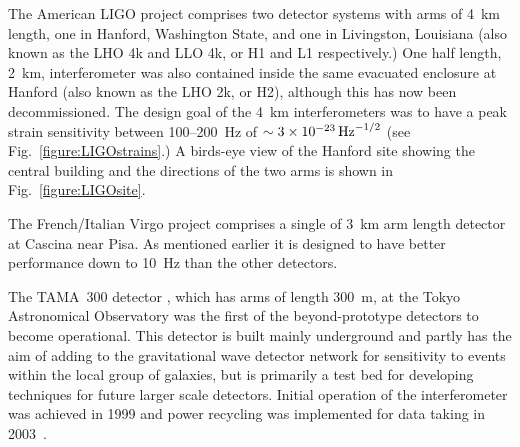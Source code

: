 \documentclass{article}
\begin{document}
The American LIGO project \cite{LIGOweb} comprises two detector
systems with arms of 4~km length, one in Hanford, Washington State, and one in
Livingston, Louisiana (also known as the LHO 4k and LLO 4k, or H1 and L1
respectively.) One half length, 2~km, interferometer was also contained inside
the same evacuated enclosure at Hanford (also known as the LHO 2k, or H2), 
although this has now been decommissioned. The
design goal of the 4~km interferometers was to have a peak strain sensitivity
between 100--200~Hz of $\sim 3\times10^{-23}\,{\rm Hz}^{-1/2}$ \cite{LIGOSRD}
(see Fig.~\ref{figure:LIGOstrains}.) A birds-eye view of the Hanford site
showing the central building and the directions of the two arms is shown in
Fig.~\ref{figure:LIGOsite}.


The French/Italian Virgo project \cite{Virgoweb} comprises a single of 3~km arm
length detector at Cascina near Pisa. As mentioned earlier it is designed to
have better performance down to 10~Hz than the other detectors.

The TAMA~300 detector \cite{TAMAweb}, which has arms of length 300~m, at the
Tokyo Astronomical Observatory was the first of the beyond-prototype detectors
to become operational. This detector is built mainly underground and partly has
the aim of adding to the gravitational wave detector network for sensitivity to
events within the local group of galaxies, but is primarily a test bed for 
developing techniques for future larger scale detectors. Initial operation of
the interferometer was achieved in 1999 and power recycling was implemented for
data taking in 2003~\cite{Arai:2003}.
\end{document}
